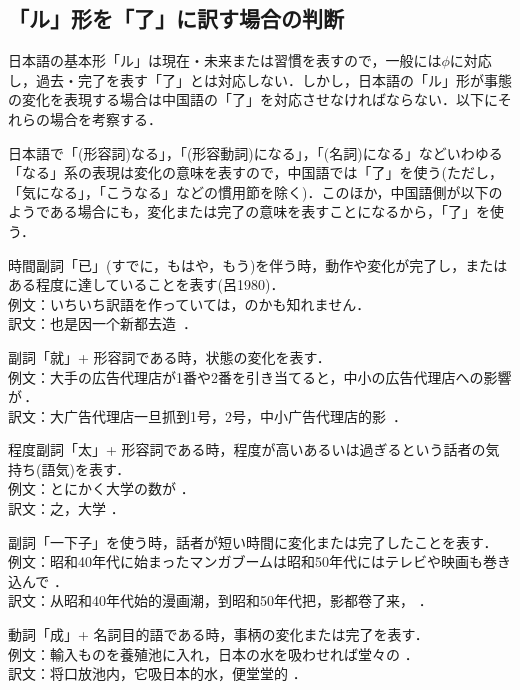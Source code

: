 \subsection{「ル」形を「了」に訳す場合の判断}

日本語の基本形「ル」は現在・未来または習慣を表すので，一般には$\phi$に対応し，過去・完了を表す「了」とは対応しない．しかし，日本語の「ル」形が事態の変化を表現する場合は中国語の「了」を対応させなければならない．以下にそれらの場合を考察する．

日本語で「(形容詞)なる」，「(形容動詞)になる」，「(名詞)になる」などいわゆる「なる」系の表現は変化の意味を表すので，中国語では「了」を使う(ただし，「気になる」，「こうなる」などの慣用節を除く)．このほか，中国語側が以下のようである場合にも，変化または完了の意味を表すことになるから，「了」を使う．
\begin{enumerater}
\renewcommand{\labelenumi}{}
\renewcommand{\theenumi}{}
\item 時間副詞「已」(すでに，もはや，もう)を伴う時，動作や変化が完了し，またはある程度に達していることを表す(呂1980)．\\例文：いちいち訳語を作っていては，のかも知れません．\\訳文：也是因一个新都去造\, ．
\item 副詞「就」+ 形容詞である時，状態の変化を表す．\\例文：大手の広告代理店が1番や2番を引き当てると，中小の広告代理店への影響が\,．\\訳文：大广告代理店一旦抓到1号，2号，中小广告代理店的影\, ．
\item 程度副詞「太」+ 形容詞である時，程度が高いあるいは過ぎるという話者の気持ち(語気)を表す．\\例文：とにかく大学の数が ．\\訳文：之，大学 ．
\item 副詞「一下子」を使う時，話者が短い時間に変化または完了したことを表す．\\例文：昭和40年代に始まったマンガブームは昭和50年代にはテレビや映画も巻き込んで ．\\訳文：从昭和40年代始的漫画潮，到昭和50年代把，影都卷了来， ．
\item 動詞「成」+ 名詞目的語である時，事柄の変化または完了を表す．\\例文：輸入ものを養殖池に入れ，日本の水を吸わせれば堂々の ．\\訳文：将口放池内，它吸日本的水，便堂堂的 ．

\end{enumerater}

